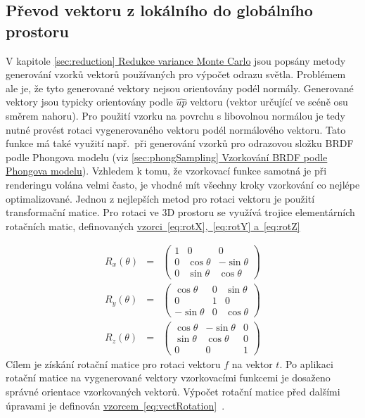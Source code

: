 \documentclass[czech,master]{diploma}
\newcommand{\uvec}[1]{\hat{#1}}
\newcommand{\fromVect}{f}
\newcommand{\toVect}{t}
\begin{document}
\subsection{Převod vektoru z lokálního do globálního prostoru}
V kapitole \hyperref[sec:reduction]{\ref{sec:reduction} Redukce variance Monte Carlo} jsou popsány metody generování vzorků vektorů používaných pro výpočet odrazu světla. Problémem ale je, že tyto generované vektory nejsou orientovány podél normály. Generované vektory jsou typicky orientovány podle \(\uvec{up}\) vektoru (vektor určující ve scéně osu směrem nahoru). Pro použití vzorku na povrchu s libovolnou normálou je tedy nutné provést rotaci vygenerovaného vektoru podél normálového vektoru. Tato funkce má také využití např.\ při generování vzorků pro odrazovou složku BRDF podle Phongova modelu (viz \hyperref[sec:phongSampling]{\ref{sec:phongSampling} Vzorkování BRDF podle Phongova modelu}). Vzhledem k tomu, že vzorkovací funkce samotná je při renderingu volána velmi často, je vhodné mít všechny kroky vzorkování co nejlépe optimalizované. Jednou z nejlepších metod pro rotaci vektoru je použití transformační matice. Pro rotaci ve 3D prostoru se využívá trojice elementárních rotačních matic, definovaných \hyperref[eq:rotX]{vzorci~\ref{eq:rotX},~\ref{eq:rotY} a~\ref{eq:rotZ}}~\cite{HughesDamEtAl13}\par
\begin{eqnarray}
  R_x(\theta) & = & \begin{pmatrix}
    1 & 0          & 0           \\
    0 & \cos\theta & -\sin\theta \\
    0 & \sin\theta & \cos\theta
  \end{pmatrix} \label{eq:rotX} \\
  R_y(\theta) & = & \begin{pmatrix}
    \cos\theta  & 0 & \sin\theta \\
    0           & 1 & 0          \\
    -\sin\theta & 0 & \cos\theta
  \end{pmatrix} \label{eq:rotY} \\
  R_z(\theta) & = & \begin{pmatrix}
    \cos\theta & -\sin\theta & 0 \\
    \sin\theta & \cos\theta  & 0 \\
    0          & 0           & 1
  \end{pmatrix}\label{eq:rotZ}
\end{eqnarray}
Cílem je získání rotační matice pro rotaci vektoru \(\fromVect\) na vektor \(\toVect\). Po aplikaci rotační matice na vygenerované vektory vzorkovacími funkcemi je dosaženo správné orientace vzorkovaných vektorů. Výpočet rotační matice před dalšími úpravami je definován \hyperref[eq:vectRotation]{vzorcem~\ref{eq:vectRotation}}~\cite{MollerHughesVectRotation}.
\end{document}
